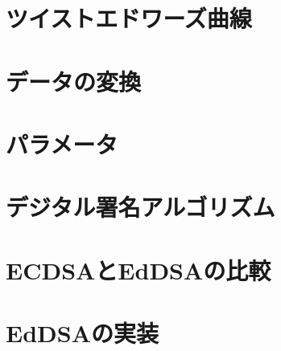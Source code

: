 \section{ツイストエドワーズ曲線}

\section{データの変換}

\newpage
\section{パラメータ}

\section{デジタル署名アルゴリズム}

\section{ECDSAとEdDSAの比較}

\section{EdDSAの実装}

